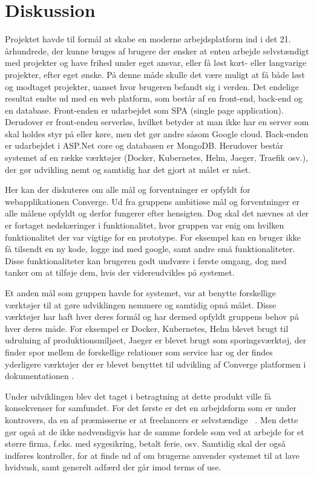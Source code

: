 \chapter{Diskussion}
\label{cha:discussion}

Projektet havde til formål at skabe en moderne arbejdsplatform ind i det 21. århundrede, der kunne bruges af brugere der ønsker at enten arbejde selvstændigt med projekter og have frihed under eget ansvar, eller få løst kort- eller langvarige projekter, efter eget ønske. På denne måde skulle det være muligt at få både løst og modtaget projekter, uanset hvor brugeren befandt sig i verden. Det endelige resultat endte ud med en web platform, som består af en front-end, back-end og en database. Front-enden er udarbejdet som SPA (single page application). Derudover er front-enden serverløs, hvilket betyder at man ikke har en server som skal holdes styr på eller køre, men det gør andre såsom Google cloud. Back-enden er udarbejdet i ASP.Net core og databasen er MongoDB. Herudover består systemet af en række værktøjer (Docker, Kubernetes, Helm, Jaeger, Traefik osv.), der gør udvikling nemt og samtidig har det gjort at målet er nået.

Her kan der diskuteres om alle mål og forventninger er opfyldt for webapplikationen Converge. Ud fra gruppens ambitiøse mål og forventninger er alle målene opfyldt og derfor fungerer efter hensigten. Dog skal det nævnes at der er fortaget nedskæringer i funktionalitet, hvor gruppen var enig om hvilken funktionalitet der var vigtige for en prototype. For eksempel kan en bruger ikke få tilsendt en ny kode, logge ind med google, samt andre små funktionaliteter. Disse funktionaliteter kan brugeren godt undvære i første omgang, dog med tanker om at tilføje dem, hvis der videreudvikles på systemet. 

Et anden mål som gruppen havde for systemet, var at benytte forskellige værktøjer til at gøre udviklingen nemmere og samtidig opnå målet. Disse værktøjer har haft hver deres formål og har dermed opfyldt gruppens behov på hver deres måde. For eksempel er Docker, Kubernetes, Helm blevet brugt til udrulning af produktionsmiljøet, Jaeger er blevet brugt som sporingsværktøj, der finder spor mellem de forskellige relationer som service har og der findes yderligere værktøjer der er blevet benyttet til udvikling af Converge platformen i dokumentationen \cite{Research}.

Under udviklingen blev det taget i betragtning at dette produkt ville få konsekvenser for samfundet. For det første er det en arbejdsform som er under kontrovers, da en af præmisserne er at freelancers er selvstændige ~\cite{controversy}. Men dette gør også at de ikke nødvendigvis har de samme fordele som ved at arbejde for et større firma, f.eks. med sygesikring, betalt ferie, osv. Samtidig skal der også indføres kontroller, for at finde ud af om brugerne anvender systemet til at lave hvidvask, samt generelt adfærd der går imod terms of use.

